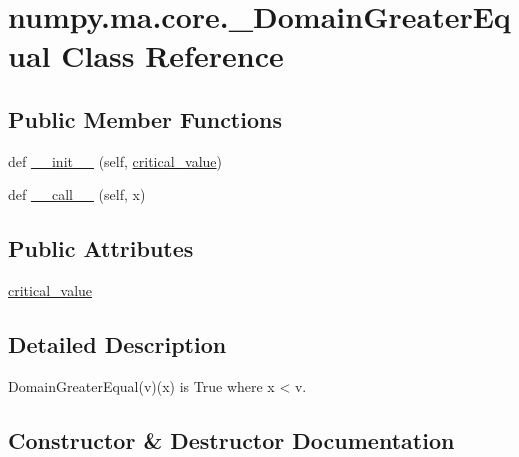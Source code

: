 \hypertarget{classnumpy_1_1ma_1_1core_1_1__DomainGreaterEqual}{}\section{numpy.\+ma.\+core.\+\_\+\+Domain\+Greater\+Equal Class Reference}
\label{classnumpy_1_1ma_1_1core_1_1__DomainGreaterEqual}
\subsection*{Public Member Functions}
\begin{DoxyCompactItemize}
\item 
def \hyperlink{classnumpy_1_1ma_1_1core_1_1__DomainGreaterEqual_a448c014a4fd276857a9c6875f3f9485a}{\+\_\+\+\_\+init\+\_\+\+\_\+} (self, \hyperlink{classnumpy_1_1ma_1_1core_1_1__DomainGreaterEqual_a63e9199d767746294905599e7d895b02}{critical\+\_\+value})
\item 
def \hyperlink{classnumpy_1_1ma_1_1core_1_1__DomainGreaterEqual_ae1239f977328f279e87e0fd2ea2b0a99}{\+\_\+\+\_\+call\+\_\+\+\_\+} (self, x)
\end{DoxyCompactItemize}
\subsection*{Public Attributes}
\begin{DoxyCompactItemize}
\item 
\hyperlink{classnumpy_1_1ma_1_1core_1_1__DomainGreaterEqual_a63e9199d767746294905599e7d895b02}{critical\+\_\+value}
\end{DoxyCompactItemize}


\subsection{Detailed Description}
\begin{DoxyVerb}DomainGreaterEqual(v)(x) is True where x < v.\end{DoxyVerb}
 

\subsection{Constructor \& Destructor Documentation}
\mbox{\label{classnumpy_1_1ma_1_1core_1_1__DomainGreaterEqual_a448c014a4fd276857a9c6875f3f9485a}} 
